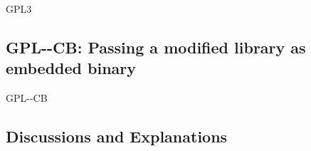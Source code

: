 \begin{license}{GPL3}
\subsection{GPL-\ver-CB: Passing a modified library as embedded binary}
\begin{lsuc}{GPL-\ver-CB}

  \useCaseB

  \begin{lsucrequires}
    \lsucmandatory{\keepLicenseElements}
    \lsucmandatory{\gplthreeEnsureCopyrightNoticeBinary}
    \lsucmandatory{\giveLicense}\passingFilesCorrectly
    \lsucmandatory{\retainCopyrightNotices}
    \lsucmandatory{\makeAllSourcesAvailable}
    \lsucmandatory{\describeHowToGetSource}
    \lsucmandatory{\addToCopyrightDialogLib}
    \lsucmandatory{\markEmbeddedModifications}
    \lsucmandatory{\arrangeEmbeddedChanges}\howToApplyTheseTerms
    \lsucmandatory{\arrangeEnclosingBinaries}
    \lsucoptional{\createChangelog}
    \lsucoptional{\addToDocumentation}
  \end{lsucrequires}

  \begin{lsucprohibits}
    \lsucitem{\noPatentLitigation}
  \end{lsucprohibits}
\end{lsuc}

\end{license}


\subsection{Discussions and Explanations}
\label{GPL2Discussion}%
\label{GPL3Discussion}

\newcommand{\gplTwoAndThree}[2]{\footnote{%
    For GPL-2.0 see \cite[cf.][\nopage wp.\ #1]{Gpl20OsiLicense1991a}.\par\noindent 
    For GPL-3.0 see \cite[cf.][\nopage wp.\ #2]{Gpl30OsiLicense2007a}.}} 

